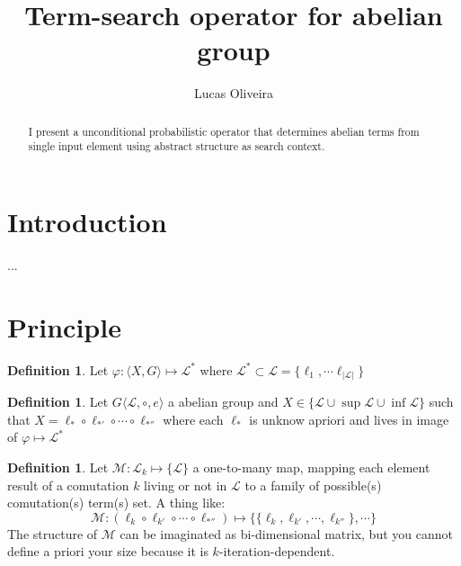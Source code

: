 \documentclass[11pt]{amsart}
\newcommand{\truncateit}[1]{\truncate{0.8\textwidth}{#1}}
\newcommand{\scititle}[1]{\title[\truncateit{#1}]{#1}}
\theoremstyle{plain}
\theoremstyle{definition}
\newtheorem{definition}[theorem]{Definition}
\begin{document}
\begin{abstract}
I present a unconditional probabilistic operator that determines abelian terms from single input element using abstract structure as search context.
\end{abstract}


\scititle{Term-search operator for abelian group}
\author{Lucas Oliveira}
\date{}
\maketitle











\section{Introduction}


...


\section{Principle}

\iffalse
Introduzir permutação de operador
utilizar algebra de lie
\fi

\begin{definition}
 Let $\varphi : \langle X, G \rangle \mapsto \mathcal L^*$ where $\mathcal L^* \subset \mathcal L = \{\ell_1,\cdots \ell_{|\mathcal L|}\}$
\end{definition}

\begin{definition}
	Let $G\langle \mathcal L , \circ,e \rangle $ a abelian group and 
	$X \in 
		\{
		\mathcal L
		\cup
		\sup \mathcal L 
		\cup  
		\inf \mathcal L
		\}
		$ 
		such that $X = \ell_* \circ \ell_{*'} \circ \cdots \circ \ell_{*''}$ where each $\ell_* $ is unknow apriori and lives in image of $\varphi \mapsto \mathcal L^*$

\end{definition}

\begin{definition}
	Let $
	\mathcal M:\mathcal L_k 
		\mapsto 
		\{\mathcal L\} $
	 a one-to-many map, mapping each element result of a comutation $k$ living or not in $\mathcal L$ to a family of possible(s) comutation(s) term(s) set.
	 A thing like:
	 	$$
	 	\mathcal M:
	 	(\ell_k \circ \ell_{k'} \circ \cdots \circ \ell_{*''}) \mapsto 
	 	\Big\{
	 	\{\ell_k ,\ell_{k'} , \cdots , \ell_{k''}\},\cdots
	 	\Big\}
	 	$$
	 The structure of $\mathcal M$ can be imaginated as bi-dimensional matrix, but you cannot define a priori your size because it is $k$-iteration-dependent.
\end{definition}
\end{document}
